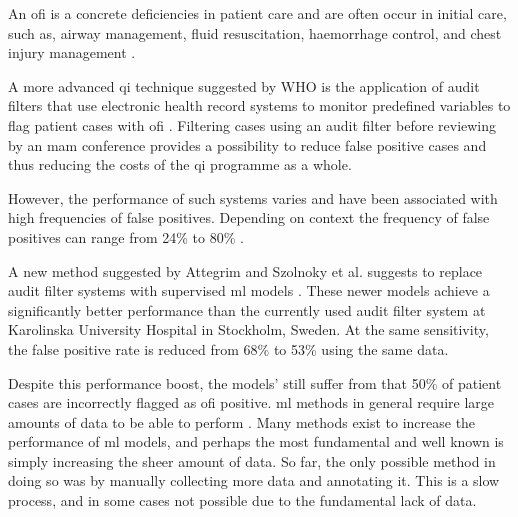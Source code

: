 \documentclass[12pt, letterpaper]{article}
\begin{document}
An \acrshort{ofi} is a concrete deficiencies in patient care and are often occur in initial care, such as, airway management, fluid resuscitation, haemorrhage control, and chest injury management \cite{world_health_organization_guidelines_2009,roy_learning_2017,oreilly_opportunities_2013,sanddal_analysis_2011}.

A more advanced \acrshort{qi} technique suggested by WHO is the application of audit filters that use electronic health record systems to monitor predefined variables to flag patient cases with \acrfull{ofi} \cite{world_health_organization_guidelines_2009}. Filtering cases using an audit filter before reviewing by an \acrshort{mam} conference provides a possibility to reduce false positive cases and thus reducing the costs of the \acrshort{qi} programme as a whole.

However, the performance of such systems varies and have been associated with high frequencies of false positives. Depending on context the frequency of false positives can range from 24\% to 80\% \cite{attergrim_predicting_2023,sanddal_analysis_2011,roy_learning_2017,ghorbani_analysis_2018}.

A new method suggested by Attegrim and Szolnoky et al. suggests to replace audit filter systems with supervised \acrfull{ml} models \cite{attergrim_predicting_2023}. These newer models achieve a significantly better performance than the currently used audit filter system at Karolinska University Hospital in Stockholm, Sweden. At the same sensitivity, the false positive rate is reduced from 68\% to 53\% using the same data.

Despite this performance boost, the models' still suffer from that 50\% of patient cases are incorrectly flagged as \acrshort{ofi} positive. \acrshort{ml} methods in general require large amounts of data to be able to perform \cite{}. Many methods exist to increase the performance of \acrshort{ml} models, and perhaps the most fundamental and well known is simply increasing the sheer amount of data. So far, the only possible method in doing so was by manually collecting more data and annotating it. This is a slow process, and in some cases not possible due to the fundamental lack of data.
\end{document}

